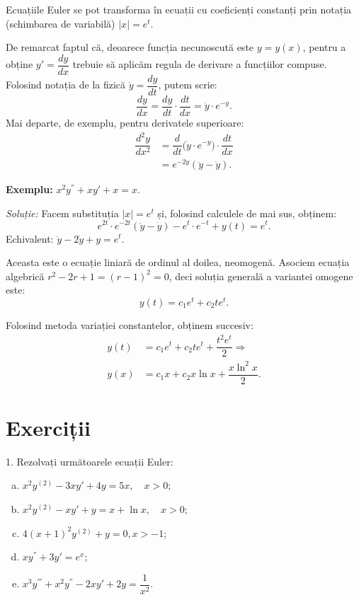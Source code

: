 Ecuațiile Euler se pot transforma în ecuații cu coeficienți constanți prin notația
(schimbarea de variabilă) $ |x| = e^t $.

De remarcat faptul că, deoarece funcția necunoscută este $ y = y(x) $, pentru
a obține $ y' = \dfrac{dy}{dx} $ trebuie să aplicăm regula de derivare
a funcțiilor compuse. Folosind notația de la fizică $ \dot{y} = \dfrac{dy}{dt} $,
putem scrie:
\[
  \dfrac{dy}{dx} = \dfrac{dy}{dt} \cdot \dfrac{dt}{dx} = \dot{y} \cdot e^{-y}.
\]
Mai departe, de exemplu, pentru derivatele superioare:
\begin{align*}
  \dfrac{d^2 y}{dx^2} &= \dfrac{d}{dt} \Big( \dot{y} \cdot e^{-y} \Big) %
  \cdot \dfrac{dt}{dx} \\
                      &= e^{-2y} (\ddot{y} - \dot{y}).
\end{align*}

\vspace{1cm}

\textbf{Exemplu:} $ x^2 y^{''} + xy' + x = x $.

\emph{Soluție:} Facem substituția $ |x| = e^t $ și, folosind calculele
de mai sus, obținem:
\[
  e^{2t} \cdot e^{-2t} (\ddot{y} - \dot{y}) - e^t \cdot e^{-t} + y(t) = e^t.
\]
Echivalent: $ \ddot{y} - 2\dot{y} + y = e^t $.

Aceasta este o ecuație liniară de ordinul al doilea, neomogenă. Asociem ecuația
algebrică $ r^2 - 2r + 1 = (r - 1)^2 = 0 $, deci soluția generală a variantei
omogene este:
\[
  y(t) = c_1 e^t + c_2 te^t.
\]

Folosind metoda variației constantelor, obținem succesiv:
\begin{align*}
  y(t) &= c_1 e^t + c_2 t e^t + \dfrac{t^2 e^t}{2} \Rightarrow \\
  y(x) &= c_1 x + c_2 x \ln x + \dfrac{x \ln^2 x}{2}.
\end{align*}



\section{Exerciții}

1. Rezolvați următoarele ecuații Euler:
\begin{enumerate}[(a)]
  \item $ x^2 y^{(2)} - 3xy' + 4y = 5x, \quad x > 0 $;
  \item $ x^2 y^{(2)} - xy' + y = x + \ln x, \quad x > 0 $;
  \item $ 4(x + 1)^2 y^{(2)} + y = 0, x > -1 $;
  \item $ xy^{''} + 3y' = e^x $;
  \item $ x^3 y^{'''} + x^2y^{''} - 2xy' + 2y = \dfrac{1}{x^2} $.
\end{enumerate}


